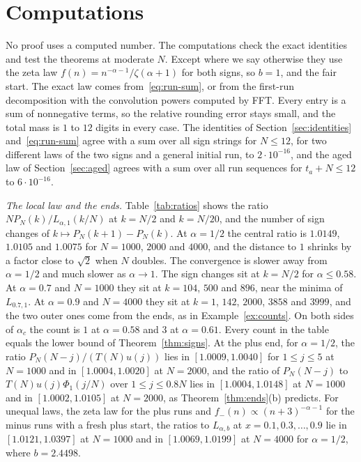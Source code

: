 \section{Computations}\label{sec:verify}

No proof uses a computed number. The computations check the exact identities and test
the theorems at moderate $N$. Except where we say otherwise they use the zeta law
$f(n)=n^{-\alpha-1}/\zeta(\alpha+1)$ for both signs, so $b=1$, and the fair start. The
exact law comes from~\eqref{eq:run-sum}, or from the first-run decomposition with the
convolution powers computed by FFT. Every entry is a sum of nonnegative terms, so the
relative rounding error stays small, and the total mass is $1$ to $12$ digits in every
case. The identities of Section~\ref{sec:identities} and~\eqref{eq:run-sum} agree with a sum
over all sign strings for $N\le12$, for two different laws of the two signs and a general
initial run, to $2\cdot10^{-16}$, and the aged law of Section~\ref{sec:aged} agrees with a sum
over all run sequences for $t_a+N\le12$ to $6\cdot10^{-16}$.

\emph{The local law and the ends.} Table~\ref{tab:ratios} shows the ratio
$NP_N(k)/L_{\alpha,1}(k/N)$ at $k=N/2$ and $k=N/20$, and the number of sign changes of
$k\mapsto P_N(k+1)-P_N(k)$. At $\alpha=1/2$ the central ratio is $1.0149$, $1.0105$ and $1.0075$
for $N=1000$, $2000$ and $4000$, and the distance to $1$ shrinks by a factor close to
$\sqrt2$ when $N$ doubles. The convergence is slower away from $\alpha=1/2$ and much slower
as $\alpha\to1$. The sign changes sit at $k=N/2$ for $\alpha\le0.58$. At $\alpha=0.7$ and
$N=1000$ they sit at $k=104$, $500$ and $896$, near the minima of $L_{0.7,1}$. At
$\alpha=0.9$ and $N=4000$ they sit at $k=1$, $142$, $2000$, $3858$ and $3999$, and the two
outer ones come from the ends, as in Example~\ref{ex:counts}. On both sides of $\alpha_c$ the
count is $1$ at $\alpha=0.58$ and $3$ at $\alpha=0.61$. Every count in the table equals the
lower bound of Theorem~\ref{thm:signs}. At the plus end, for $\alpha=1/2$, the ratio
$P_N(N-j)/(T(N)u(j))$ lies in $[1.0009,1.0040]$ for $1\le j\le5$ at $N=1000$ and in
$[1.0004,1.0020]$ at $N=2000$, and the ratio of $P_N(N-j)$ to $T(N)u(j)\Phi_1(j/N)$ over
$1\le j\le0.8N$ lies in $[1.0004,1.0148]$ at $N=1000$ and in $[1.0002,1.0105]$ at $N=2000$, as
Theorem~\ref{thm:ends}(b) predicts. For unequal laws, the zeta law for the plus runs and
$f_\minus(n)\propto(n+3)^{-\alpha-1}$ for the minus runs with a fresh plus start, the ratios to
$L_{\alpha,b}$ at $x=0.1,0.3,\dots,0.9$ lie in $[1.0121,1.0397]$ at $N=1000$ and in
$[1.0069,1.0199]$ at $N=4000$ for $\alpha=1/2$, where $b=2.4498$.

